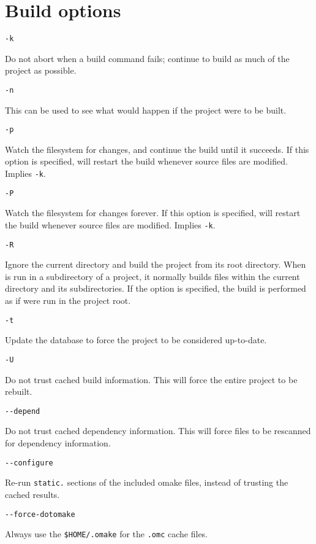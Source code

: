 \section{Build options}

 \verb+-k+

Do not abort when a build command fails;
continue to build as much of the project as possible.

 \verb+-n+

This can be used to see what would happen if the project were to be built.

 \verb+-p+

Watch the filesystem for changes, and continue the build until it succeeds.  If this
option is specified,  will restart the build whenever source files are modified. Implies
\texttt{-k}.

 \verb+-P+

Watch the filesystem for changes forever.  If this option is specified, 
will restart the build whenever source files are modified. Implies
\texttt{-k}.

 \verb+-R+

Ignore the current directory and build the project from its root directory.  When
 is run in a subdirectory of a project, it normally builds files within the current
directory and its subdirectories.  If the  option is specified, the build is performed as if
 were run in the project root.

 \verb+-t+

Update the  database to force the project to be considered up-to-date.

 \verb+-U+

Do not trust cached build information.  This will force the entire project to be rebuilt.

 \verb+--depend+

Do not trust cached dependency information.  This will force files to be rescanned
for dependency information.

 \verb+--configure+

Re-run \verb+static.+ sections of the included omake files, instead of
trusting the cached results.

 \verb+--force-dotomake+

Always use the \verb+$HOME/.omake+ for the \verb+.omc+ cache files.

